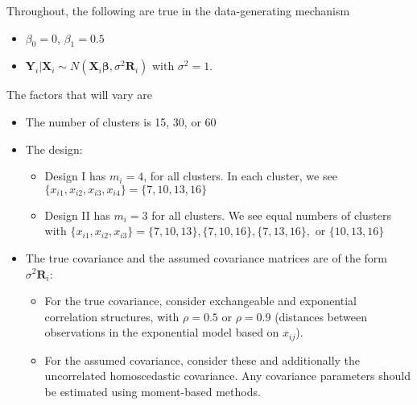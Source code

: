 \documentclass[11pt, letterpaper]{article}
\newcommand{\bX}{{\bm X}}
\newcommand{\bY}{{\bm Y}}
\newcommand{\bR}{{\bm R}}
\newcommand{\bbeta}{{\bm \beta}}
\begin{document}
{Throughout, the following are true in the data-generating mechanism
\begin{itemize}
\item $\beta_0=0$, $\beta_1 = 0.5$
\item $\bY_i|\bX_i\sim N(\bX_i \bbeta, \sigma^2 \bR_i)$ with $\sigma^2=1$. 
\end{itemize}
The factors that will vary are
\begin{itemize}
\item The number of clusters is 15, 30, or 60
\item The design: \begin{itemize}
\item Design I has $m_i = 4$, for all clusters. In each cluster, we see $\{x_{i1}, x_{i2},x_{i3},x_{i4}\}=\{7,10,13,16\}$
\item Design II has $m_i=3$ for all clusters.  We see equal numbers of clusters with $\{x_{i1}, x_{i2},x_{i3}\}=\{7,10,13\}, \{7,10,16\}, \{7, 13, 16\}, \textrm{ or }\{10, 13, 16\}$
\end{itemize}
\item The true covariance and the assumed covariance matrices are of the form $\sigma^2 \bR_i$:
\begin{itemize}
\item For the true covariance, consider exchangeable and exponential correlation structures, with $\rho=0.5$ or $\rho=0.9$ (distances between observations in the exponential model based on $x_{ij}$). 
\item For the assumed covariance, consider these and additionally the uncorrelated homoscedastic covariance.  Any covariance parameters should be estimated  using moment-based methods.
\end{itemize}
\end{itemize}}
\end{document}
